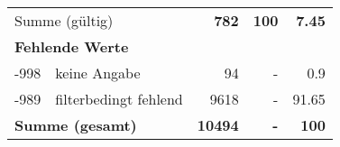 \begin{longtable}{lXrrr}
     \midrule
     \multicolumn{2}{l}{Summe (gültig)} &
       \textbf{\num{782}} &
     \textbf{\num{100}} &
       \textbf{\num[round-mode=places,round-precision=2]{7.45}} \\
     \multicolumn{5}{l}{\textbf{Fehlende Werte}}\\
       -998 &
       keine Angabe &
         \num{94} &
        - &
         \num[round-mode=places,round-precision=2]{0.9} \\
       -989 &
       filterbedingt fehlend &
         \num{9618} &
        - &
         \num[round-mode=places,round-precision=2]{91.65} \\
     \midrule
     \multicolumn{2}{l}{\textbf{Summe (gesamt)}} &
          \textbf{\num{10494}} &
        \textbf{-} &
        \textbf{\num{100}} \\
     \bottomrule
     \end{longtable}
     
